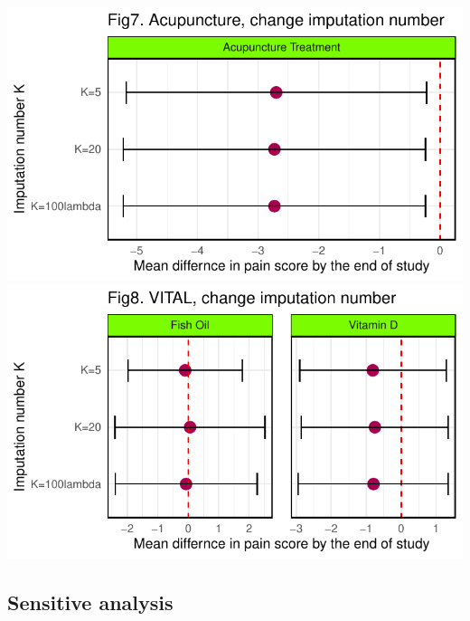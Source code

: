 \documentclass{article}
\newcommand{\pandocbounded}[1]{#1}
\begin{document}
\pandocbounded{\includegraphics[keepaspectratio]{Final_Report_files/figure-latex/unnamed-chunk-39-1.pdf}}
\pandocbounded{\includegraphics[keepaspectratio]{Final_Report_files/figure-latex/unnamed-chunk-39-2.pdf}}

\subsection{Sensitive analysis}\label{sensitive-analysis}
\end{document}
